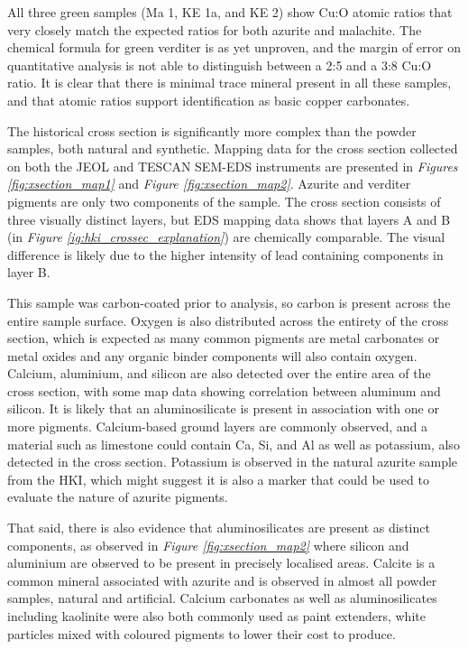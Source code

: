 All three green samples (Ma 1, KE 1a, and KE 2) show Cu:O atomic ratios that very closely match the expected ratios for both azurite and malachite. The chemical formula for green verditer is as yet unproven, and the margin of error on quantitative analysis is not able to distinguish between a 2:5 and a 3:8 Cu:O ratio. It is clear that there is minimal trace mineral present in all these samples, and that atomic ratios support identification as basic copper carbonates.


The historical cross section is significantly more complex than the powder samples, both natural and synthetic. Mapping data for the cross section collected on both the JEOL and TESCAN SEM-EDS instruments are presented in \textit{Figures \ref{fig:xsection_map1}} and \textit{Figure \ref{fig:xsection_map2}}. Azurite and verditer pigments are only two components of the sample. The cross section consists of three visually distinct layers, but EDS mapping data shows that layers A and B (in \textit{Figure \ref{ig:hki_crossec_explanation}}) are chemically comparable. The visual difference is likely due to the higher intensity of lead containing components in layer B. 

This sample was carbon-coated prior to analysis, so carbon is present across the entire sample surface. Oxygen is also distributed across the entirety of the cross section, which is expected as many common pigments are metal carbonates or metal oxides and any organic binder components will also contain oxygen. Calcium, aluminium, and silicon are also detected over the entire area of the cross section, with some map data showing correlation between aluminum and silicon. It is likely that an aluminosilicate is present in association with one or more pigments. Calcium-based ground layers are commonly observed, and a material such as limestone could contain Ca, Si, and Al as well as potassium, also detected in the cross section. Potassium is observed in the natural azurite sample from the HKI, which might suggest it is also a marker that could be used to evaluate the nature of azurite pigments.

That said, there is also evidence that aluminosilicates are present as distinct components, as observed in \textit{Figure \ref{fig:xsection_map2}} where silicon and aluminium are observed to be present in precisely localised areas. Calcite is a common mineral associated with azurite and is observed in almost all powder samples, natural and artificial. Calcium carbonates as well as aluminosilicates including kaolinite were also both commonly used as paint extenders, white particles mixed with coloured pigments to lower their cost to produce.~\autocite{Townsend}

